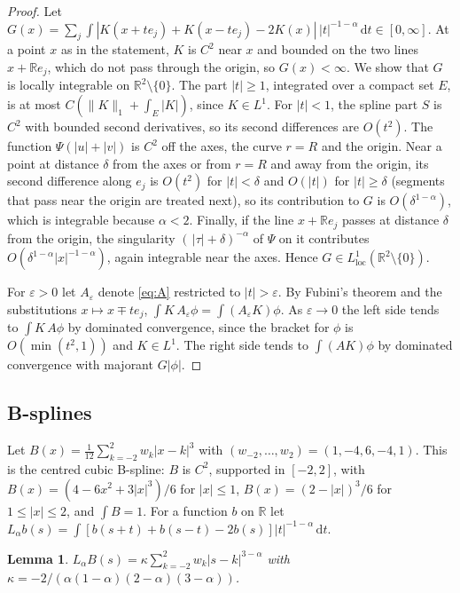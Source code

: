 \documentclass[11pt]{amsart}
\newtheorem{lemma}[equation]{Lemma}
\theoremstyle{definition}
\theoremstyle{remark}
\numberwithin{equation}{section}
\newcommand{\R}{\mathbb{R}}
\newcommand{\dd}{\,\mathrm{d}}
\begin{document}
\begin{proof}
Let $G(x)=\sum_j\int|K(x+te_j)+K(x-te_j)-2K(x)|\,|t|^{-1-\alpha}\dd t\in[0,\infty]$. At a point $x$ as in the statement, $K$ is $C^2$ near $x$ and bounded on the two lines $x+\R e_j$, which do not pass through the origin, so $G(x)<\infty$. We show that $G$ is locally integrable on $\R^2\setminus\{0\}$. The part $|t|\ge1$, integrated over a compact set $E$, is at most $C(\|K\|_1+\int_E|K|)$, since $K\in L^1$. For $|t|<1$, the spline part $S$ is $C^2$ with bounded second derivatives, so its second differences are $O(t^2)$. The function $\Psi(|u|+|v|)$ is $C^2$ off the axes, the curve $r=R$ and the origin. Near a point at distance $\delta$ from the axes or from $r=R$ and away from the origin, its second difference along $e_j$ is $O(t^2)$ for $|t|<\delta$ and $O(|t|)$ for $|t|\ge\delta$ (segments that pass near the origin are treated next), so its contribution to $G$ is $O(\delta^{1-\alpha})$, which is integrable because $\alpha<2$. Finally, if the line $x+\R e_j$ passes at distance $\delta$ from the origin, the singularity $(\,|\tau|+\delta)^{-\alpha}$ of $\Psi$ on it contributes $O(\delta^{1-\alpha}|x|^{-1-\alpha})$, again integrable near the axes. Hence $G\in L^1_{\mathrm{loc}}(\R^2\setminus\{0\})$.

For $\varepsilon>0$ let $A_\varepsilon$ denote \eqref{eq:A} restricted to $|t|>\varepsilon$. By Fubini's theorem and the substitutions $x\mapsto x\mp te_j$, $\int K\,A_\varepsilon\phi=\int(A_\varepsilon K)\phi$. As $\varepsilon\to0$ the left side tends to $\int K\,A\phi$ by dominated convergence, since the bracket for $\phi$ is $O(\min(t^2,1))$ and $K\in L^1$. The right side tends to $\int(AK)\phi$ by dominated convergence with majorant $G|\phi|$.
\end{proof}

\subsection{B-splines} Let $B(x)=\frac1{12}\sum_{k=-2}^2w_k|x-k|^3$ with $(w_{-2},\dots,w_2)=(1,-4,6,-4,1)$. This is the centred cubic B-spline: $B$ is $C^2$, supported in $[-2,2]$, with $B(x)=(4-6x^2+3|x|^3)/6$ for $|x|\le1$, $B(x)=(2-|x|)^3/6$ for $1\le|x|\le2$, and $\int B=1$. For a function $b$ on $\R$ let $L_\alpha b(s)=\int[b(s+t)+b(s-t)-2b(s)]|t|^{-1-\alpha}\dd t$.

\begin{lemma}\label{lem:bspline}
$L_\alpha B(s)=\kappa\sum_{k=-2}^2w_k|s-k|^{3-\alpha}$ with $\kappa=-2/(\alpha(1-\alpha)(2-\alpha)(3-\alpha))$.
\end{lemma}
\end{document}
